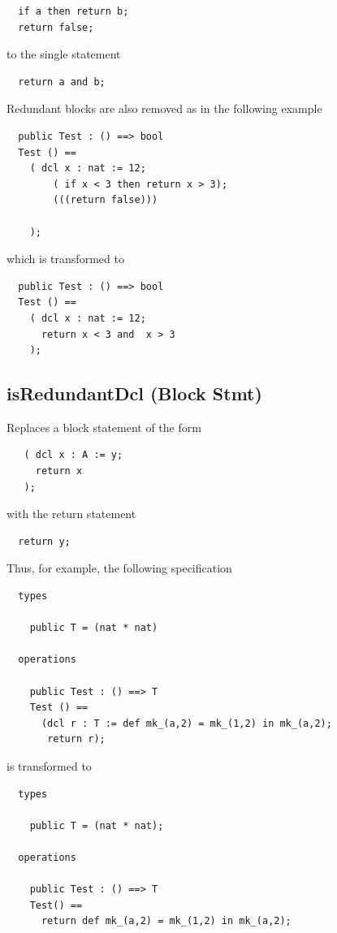 \documentclass[\pformat,12pt]{article}
\begin{document}
\begin{verbatim}
  if a then return b;
  return false;
\end{verbatim}

to the single statement

\begin{verbatim}
  return a and b;
\end{verbatim}

Redundant blocks are also removed as in the following example

\begin{verbatim}
  public Test : () ==> bool
  Test () ==
    ( dcl x : nat := 12;
        ( if x < 3 then return x > 3);
        (((return false)))
                
    );
\end{verbatim}

which is transformed to

\begin{verbatim}
  public Test : () ==> bool
  Test () ==
    ( dcl x : nat := 12;
      return x < 3 and  x > 3 
    ); 
\end{verbatim}

\subsection{isRedundantDcl (Block Stmt)}
  Replaces a block statement of the form

\begin{verbatim}
   ( dcl x : A := y;
     return x
   );
\end{verbatim}

with the return statement

\begin{verbatim}
  return y;
\end{verbatim}

Thus, for example, the following specification

\begin{verbatim}
  types

    public T = (nat * nat)

  operations

    public Test : () ==> T
    Test () ==
      (dcl r : T := def mk_(a,2) = mk_(1,2) in mk_(a,2);
       return r);
\end{verbatim}

is transformed to

\begin{verbatim}
  types

    public T = (nat * nat);

  operations

    public Test : () ==> T
    Test() ==
      return def mk_(a,2) = mk_(1,2) in mk_(a,2);
\end{verbatim}
\end{document}

